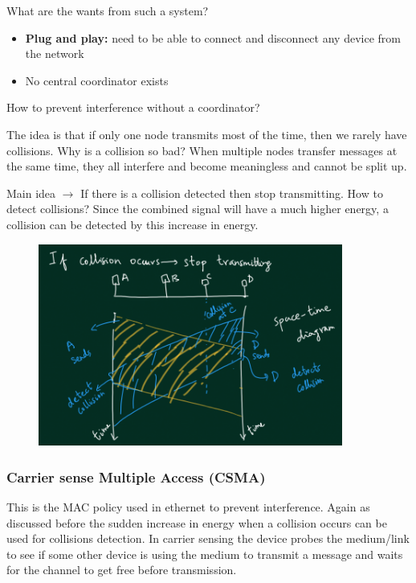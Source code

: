 \documentclass[12pt]{article}
\newcommand{\tbox}[1]{\noindent\fbox{\parbox{\textwidth}{#1}}}
\begin{document}
What are the wants from such a system?
\begin{itemize}
    \item \textbf{Plug and play:} need to be able to connect and disconnect any device from the network
    \item No central coordinator exists
\end{itemize}


How to prevent interference without a coordinator?

The idea is that if only one node transmits most of the time, then we rarely have collisions. 
Why is a collision so bad? When multiple nodes transfer messages at the same time, they all interfere and become 
meaningless and cannot be split up. 

Main idea \(\rightarrow\) If there is a collision detected then stop transmitting. How to detect collisions?
Since the combined signal will have a much higher energy, a collision can be detected by this increase in energy. 


\begin{figure}[H]
    \centering
    \includegraphics[width=10cm]{Diagrams/collision.png}
\end{figure}

\noindent\tbox{
    \begin{center}
    \textbf{\Huge Lecture 15}
    \end{center}
}
\subsubsection{Carrier sense Multiple Access (CSMA)}
This is the MAC policy used in ethernet to prevent interference.
Again as discussed before the sudden increase in energy when a collision 
occurs can be used for collisions detection. In carrier sensing the 
device probes the medium/link to see if some other device is using the medium 
to transmit a message and waits for the channel to get free before transmission. 
\end{document}
